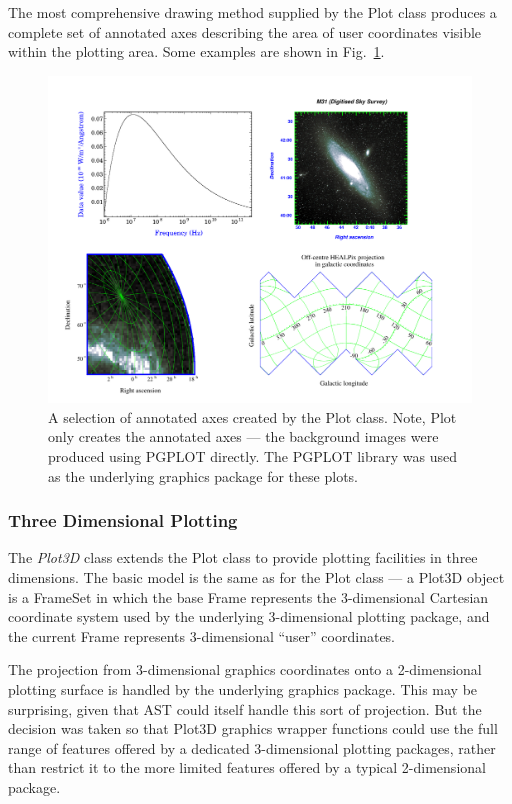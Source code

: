 \documentclass[final,authoryear,5p,times,twocolumn]{elsarticle}
\begin{document}
The most comprehensive drawing method supplied by the Plot class produces
a complete set of annotated axes describing the area of user coordinates
visible within the plotting area. Some examples are shown in
Fig.~\ref{fig:2dplots}.

\begin{figure}[ht]
\centering
\includegraphics[width=\textwidth]{2dplots}
\caption{A selection of annotated axes created by the Plot class. Note,
Plot only creates the annotated axes --- the background images were
produced using PGPLOT directly. The PGPLOT library was used as the
underlying graphics package for these plots.}
\label{fig:2dplots}
\end{figure}

\subsubsection{Three Dimensional Plotting}

The \emph{Plot3D} class extends the Plot class to provide plotting
facilities in three dimensions. The basic model is the same as for the
Plot class --- a Plot3D object is a FrameSet in which the base Frame
represents the 3-dimensional Cartesian coordinate system used by the
underlying 3-dimensional plotting package, and the current Frame
represents 3-dimensional ``user'' coordinates.

The projection from 3-dimensional graphics coordinates onto a
2-dimensional plotting surface is handled by the underlying graphics
package. This may be surprising, given that AST could itself handle this
sort of projection. But the decision was taken so that Plot3D graphics
wrapper functions could use the full range of features offered by a
dedicated 3-dimensional plotting packages, rather than restrict it to the
more limited features offered by a typical 2-dimensional package.
\end{document}
